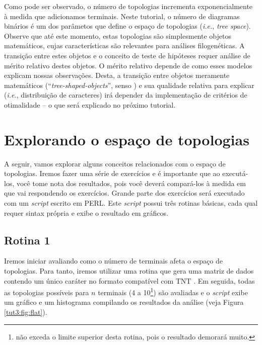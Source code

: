 \begin{refsection}


	Como pode ser observado, o número de topologias incrementa exponencialmente à medida que adicionamos terminais. Neste tutorial, o número de diagramas binários é um dos parâmetos que define o espaço de topologias (\textit{i.e.}, \textit{tree space}). Observe que até este momento, estas topologias são simplesmente objetos matemáticos, cujas características são relevantes para análises filogenéticas. A transição entre estes objetos e o conceito de teste de hipóteses requer análise de mérito relativo destes objetos. O mérito relativo depende de como esses modelos explicam nossas observações. Desta, a transição entre objetos meramente matemáticos (``\textit{tree-shaped-objects}'', senso \cite{Wheeler_2012}) e sua qualidade relativa para explicar (\textit{i.e.}, distribuição de caracteres) irá depender da implementação de critérios de otimalidade -- o que será explicado no próximo tutorial.


\section{Explorando o espaço de topologias}\label{tut3:tree_space_expĺore}

	A seguir, vamos explorar alguns conceitos relacionados com o espaço de topologias. Iremos fazer uma série de exercícios e é importante que ao executá-los, você tome nota dos resultados, pois você deverá compará-los à medida em que vai respondendo os exercícios. Grande parte dos exercícios será executado com um \textit{script} escrito em PERL. Este \textit{script} possui três rotinas básicas, cada qual requer sintax própria e exibe o resultado em gráficos.

\subsection{Rotina 1}\label{tut3:subs:flat}
	Iremos iniciar avaliando como o número de terminais afeta o espaço de topologias. Para tanto, iremos utilizar uma rotina que gera uma matriz de dados contendo um único caráter no formato compatível com TNT \parencite{GoloboffETAL2008}. Em seguida, todas as topologias possíveis para $n$ terminais (4 a 10\footnote{não exceda o limite superior desta rotina, pois o resultado demorará muito.}) são avaliadas e o \textit{script} exibe um gráfico e um histograma compilando os resultados da análise (veja Figura \ref{tut3:fig:flat}).


\end{refsection}
